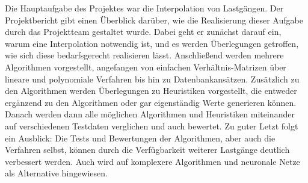 
\noindent Die Hauptaufgabe des Projektes war die Interpolation von Lastgängen. Der Projektbericht gibt einen Überblick darüber, wie die Realisierung dieser Aufgabe durch das Projektteam gestaltet wurde. Dabei geht er zunächst darauf ein, warum eine Interpolation notwendig ist, und es werden Überlegungen getroffen, wie sich diese bedarfsgerecht realisieren lässt. Anschließend werden mehrere Algorithmen vorgestellt, angefangen von einfachen Verhältnis-Matrizen über lineare und polynomiale Verfahren bis hin zu Datenbankansätzen. Zusätzlich zu den Algorithmen werden Überlegungen zu Heuristiken vorgestellt, die entweder ergänzend zu den Algorithmen oder gar eigenständig Werte generieren können. Danach werden dann alle möglichen Algorithmen und Heuristiken miteinander auf verschiedenen Testdaten verglichen und auch bewertet. Zu guter Letzt folgt ein Ausblick: Die Tests und Bewertungen der Algorithmen, aber auch die Verfahren selbst, können durch die Verfügbarkeit weiterer Lastgänge deutlich verbessert werden. Auch wird auf komplexere Algorithmen und neuronale Netze als Alternative hingewiesen.